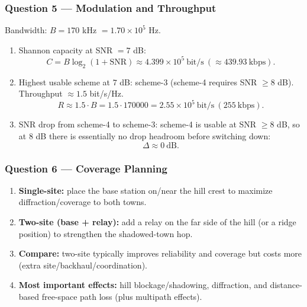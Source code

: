 \documentclass[11pt,a4paper]{article}
\begin{document}
\subsubsection*{Question 5 --- Modulation and Throughput}
Bandwidth: $B=170$ kHz $=1.70\times 10^5$ Hz.

\begin{enumerate}[label=\alph*.]
    \item Shannon capacity at SNR $=7$ dB:
    \[
    C=B\log_2(1+\mathrm{SNR})\approx 4.399\times 10^5\ \text{bit/s}\ (\approx 439.93\ \text{kbps}).
    \]
    \item Highest usable scheme at $7$ dB: scheme-3 (scheme-4 requires SNR $\ge 8$ dB). Throughput $\approx 1.5$ bit/s/Hz.
    \[
    R\approx 1.5\cdot B=1.5\cdot 170000=2.55\times 10^5\ \text{bit/s}\ (255\ \text{kbps}).
    \]
    \item SNR drop from scheme-4 to scheme-3: scheme-4 is usable at SNR $\ge 8$ dB, so at $8$ dB there is essentially no drop headroom before switching down:
    \[
    \Delta \approx 0\ \text{dB}.
    \]
\end{enumerate}

\subsubsection*{Question 6 --- Coverage Planning}
\begin{enumerate}[label=\alph*.]
    \item \textbf{Single-site:} place the base station on/near the hill crest to maximize diffraction/coverage to both towns.
    \item \textbf{Two-site (base + relay):} add a relay on the far side of the hill (or a ridge position) to strengthen the shadowed-town hop.
    \item \textbf{Compare:} two-site typically improves reliability and coverage but costs more (extra site/backhaul/coordination).
    \item \textbf{Most important effects:} hill blockage/shadowing, diffraction, and distance-based free-space path loss (plus multipath effects).
    
\end{enumerate}
\end{document}
